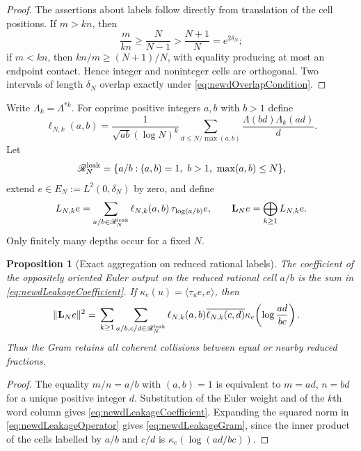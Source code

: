\documentclass[11pt]{amsart}
\newtheorem{proposition}[theorem]{Proposition}
\theoremstyle{definition}
\theoremstyle{remark}
\begin{document}
\begin{proof}
The assertions about labels follow directly from translation of the cell
positions.  If $m>kn$, then
\[
 \frac{m}{kn}\geq\frac N{N-1}>\frac{N+1}{N}=e^{2\delta_N};
\]
if $m<kn$, then $kn/m\geq(N+1)/N$, with equality producing at most an
endpoint contact.  Hence integer and noninteger cells are orthogonal.
Two intervals of length $\delta_N$ overlap exactly under
\eqref{eq:newdOverlapCondition}.
\end{proof}

Write $\Lambda_k=\Lambda^{*k}$.  For coprime positive integers $a,b$ with
$b>1$ define
\begin{equation}\label{eq:newdLeakageCoefficient}
 \ell_{N,k}(a,b)=
 \frac1{\sqrt{ab}(\log N)^k}
 \sum_{d\leq N/\max(a,b)}
       \frac{\Lambda(bd)\Lambda_k(ad)}d.
\end{equation}
Let
\[
 \mathscr R_N^{\rm leak}
 =\{a/b:(a,b)=1,\ b>1,\ \max(a,b)\leq N\},
\]
extend $e\in E_N:=L^2(0,\delta_N)$ by zero, and define
\begin{equation}\label{eq:newdLeakageOperator}
 L_{N,k}e=\sum_{a/b\in\mathscr R_N^{\rm leak}}
   \ell_{N,k}(a,b)\,\tau_{\log(a/b)}e,
 \qquad
 \mathbf L_Ne=\bigoplus_{k\geq1}L_{N,k}e.
\end{equation}
Only finitely many depths occur for a fixed $N$.

\begin{proposition}[Exact aggregation on reduced rational labels]
\label{prop:newdRationalAggregation}
The coefficient of the oppositely oriented Euler output on the reduced
rational cell $a/b$ is the sum in
\eqref{eq:newdLeakageCoefficient}.  If
$\kappa_e(u)=\langle\tau_ue,e\rangle$, then
\begin{align}
 \|\mathbf L_Ne\|^2
 ={}&\sum_{k\geq1}
 \sum_{a/b,c/d\in\mathscr R_N^{\rm leak}}
 \ell_{N,k}(a,b)\overline{\ell_{N,k}(c,d)}
 \kappa_e\!\left(\log\frac{ad}{bc}\right).
 \label{eq:newdLeakageGram}
\end{align}
Thus the Gram retains all coherent collisions between equal or nearby
reduced fractions.
\end{proposition}

\begin{proof}
The equality $m/n=a/b$ with $(a,b)=1$ is equivalent to
$m=ad$, $n=bd$ for a unique positive integer $d$.  Substitution of the
Euler weight and of the $k$th word column gives
\eqref{eq:newdLeakageCoefficient}.  Expanding the squared norm in
\eqref{eq:newdLeakageOperator} gives
\eqref{eq:newdLeakageGram}, since the inner product of the cells labelled by
$a/b$ and $c/d$ is $\kappa_e(\log(ad/bc))$.
\end{proof}
\end{document}
